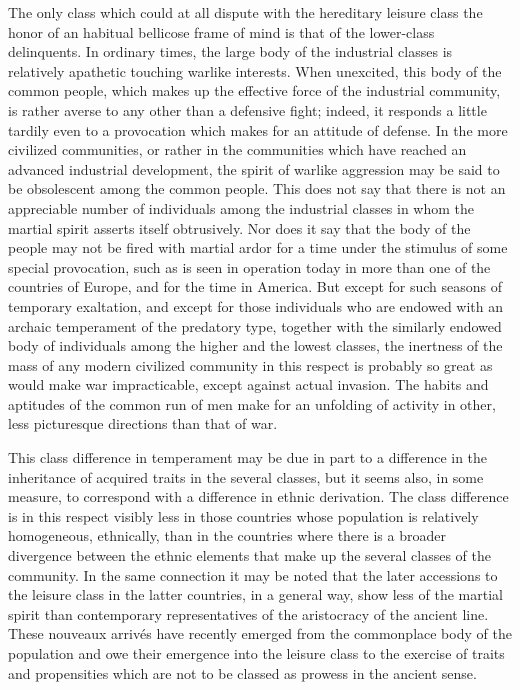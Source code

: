 \documentclass[12pt]{report}
\begin{document}
The only class which could at all dispute with the hereditary leisure
class the honor of an habitual bellicose frame of mind is that of
the lower-class delinquents. In ordinary times, the large body of the
industrial classes is relatively apathetic touching warlike interests.
When unexcited, this body of the common people, which makes up the
effective force of the industrial community, is rather averse to any
other than a defensive fight; indeed, it responds a little tardily even
to a provocation which makes for an attitude of defense. In the more
civilized communities, or rather in the communities which have reached
an advanced industrial development, the spirit of warlike aggression
may be said to be obsolescent among the common people. This does not
say that there is not an appreciable number of individuals among
the industrial classes in whom the martial spirit asserts itself
obtrusively. Nor does it say that the body of the people may not be
fired with martial ardor for a time under the stimulus of some special
provocation, such as is seen in operation today in more than one of the
countries of Europe, and for the time in America. But except for such
seasons of temporary exaltation, and except for those individuals who
are endowed with an archaic temperament of the predatory type, together
with the similarly endowed body of individuals among the higher and
the lowest classes, the inertness of the mass of any modern civilized
community in this respect is probably so great as would make war
impracticable, except against actual invasion. The habits and aptitudes
of the common run of men make for an unfolding of activity in other,
less picturesque directions than that of war.

This class difference in temperament may be due in part to a difference
in the inheritance of acquired traits in the several classes, but it
seems also, in some measure, to correspond with a difference in ethnic
derivation. The class difference is in this respect visibly less in
those countries whose population is relatively homogeneous, ethnically,
than in the countries where there is a broader divergence between the
ethnic elements that make up the several classes of the community. In
the same connection it may be noted that the later accessions to the
leisure class in the latter countries, in a general way, show less of
the martial spirit than contemporary representatives of the aristocracy
of the ancient line. These nouveaux arrivés have recently emerged from
the commonplace body of the population and owe their emergence into the
leisure class to the exercise of traits and propensities which are not
to be classed as prowess in the ancient sense.
\end{document}
